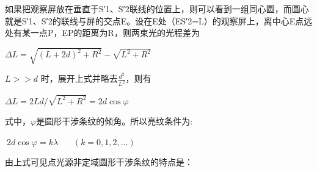 \documentclass[11pt,a4paper,oneside]{article}
\begin{document}
如果把观察屏放在垂直于S′1、S′2联线的位置上，则可以看到一组同心圆，而圆心就是S′1、S′2的联线与屏的交点E。设在E处（ES′2=L）的观察屏上，离中心E点远处有某一点P，EP的距离为R，则两束光的光程差为
\begin{center}
$\displaystyle\Delta L = \sqrt{\left ( L + 2d \right )^{2}+ R^{2}} - \sqrt{L^{2} + R^{2}}$
\end{center}
$L >> d$ 时，展开上式并略去$\displaystyle\frac{d^{2}}{L^{2}}$，则有
\begin{center}
$\displaystyle\Delta L = 2Ld / \sqrt{L^{2} + R^{2}} = 2d\cos \varphi $
\end{center}
式中，$\varphi$是圆形干涉条纹的倾角。所以亮纹条件为:
\begin{center}
$\displaystyle\ 2d\cos \varphi  = k\lambda  \ \ \ \ \ \ \ \ (k = 0,1,2,...)$
\end{center}
由上式可见点光源非定域圆形干涉条纹的特点是：
\end{document}
